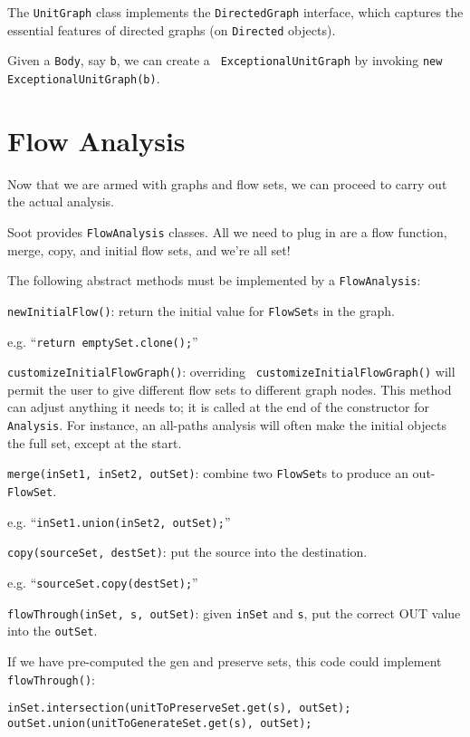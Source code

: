 \documentclass{article}
\begin{document}
The {\tt UnitGraph} class implements the {\tt DirectedGraph} interface,
which captures the essential features of directed graphs (on {\tt Directed}
objects).

Given a {\tt Body}, say {\tt b}, we can create a {\tt
ExceptionalUnitGraph} by invoking {\tt new ExceptionalUnitGraph(b)}.

\section{Flow Analysis}

Now that we are armed with graphs and flow sets, we can proceed to
carry out the actual analysis.

Soot provides {\tt FlowAnalysis} classes.  All we need to plug in are
a flow function, merge, copy, and initial flow sets, and we're all set!

The following abstract methods must be implemented by a {\tt FlowAnalysis}:

\begin{description}
\item{{\tt newInitialFlow()}:} return the initial value for {\tt FlowSet}s in
the graph.

e.g. ``{\tt return emptySet.clone();}''

\item{{\tt customizeInitialFlowGraph()}:} overriding {\tt
customizeInitialFlowGraph()} will permit the user to give different
flow sets to different graph nodes.  This method can adjust anything it
needs to; it is called at the end of the constructor for {\tt
Analysis}.  For instance, an all-paths analysis will often make the
initial objects the full set, except at the start.

\item{{\tt merge(inSet1, inSet2, outSet)}:} combine two {\tt FlowSet}s to produce
an out-{\tt FlowSet}.

e.g. ``{\tt inSet1.union(inSet2, outSet);}''

\item{{\tt copy(sourceSet, destSet)}:} put the source into the destination.

e.g. ``{\tt sourceSet.copy(destSet);}''

\item{{\tt flowThrough(inSet, s, outSet)}:} given {\tt inSet} and {\tt s}, put
the correct OUT value into the {\tt outSet}.

If we have pre-computed the gen and preserve sets, this code could implement
{\tt flowThrough()}:
\begin{verbatim}
inSet.intersection(unitToPreserveSet.get(s), outSet);
outSet.union(unitToGenerateSet.get(s), outSet);
\end{verbatim}
\end{description}
\end{document}
